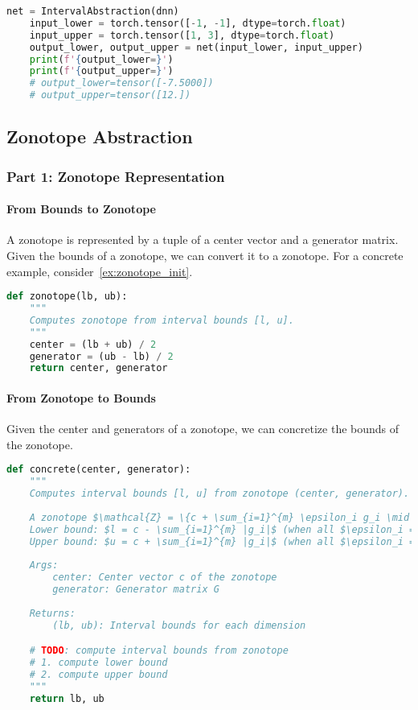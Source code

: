 \begin{lstlisting}[language=Python]
    net = IntervalAbstraction(dnn)
    input_lower = torch.tensor([-1, -1], dtype=torch.float)
    input_upper = torch.tensor([1, 3], dtype=torch.float)
    output_lower, output_upper = net(input_lower, input_upper)
    print(f'{output_lower=}')
    print(f'{output_upper=}')
    # output_lower=tensor([-7.5000])
    # output_upper=tensor([12.])
\end{lstlisting}


\subsection{Zonotope Abstraction}

\subsubsection{Part 1: Zonotope Representation}

\paragraph{From Bounds to Zonotope}

A zonotope is represented by a tuple of a center vector and a generator matrix. 
Given the bounds of a zonotope, we can convert it to a zonotope.
For a concrete example, consider~\autoref{ex:zonotope_init}.
\begin{lstlisting}[language=Python]
def zonotope(lb, ub):
    """
    Computes zonotope from interval bounds [l, u].
    """
    center = (lb + ub) / 2
    generator = (ub - lb) / 2
    return center, generator
\end{lstlisting}

\paragraph{From Zonotope to Bounds}

Given the center and generators of a zonotope, we can concretize the bounds of the zonotope.
\begin{lstlisting}[language=Python]
def concrete(center, generator):
    """
    Computes interval bounds [l, u] from zonotope (center, generator).
    
    A zonotope $\mathcal{Z} = \{c + \sum_{i=1}^{m} \epsilon_i g_i \mid \epsilon_i \in [-1,1]\}$ can be converted to interval bounds:
    Lower bound: $l = c - \sum_{i=1}^{m} |g_i|$ (when all $\epsilon_i = -\text{sign}(g_i)$)
    Upper bound: $u = c + \sum_{i=1}^{m} |g_i|$ (when all $\epsilon_i = +\text{sign}(g_i)$)
    
    Args:
        center: Center vector c of the zonotope
        generator: Generator matrix G 
        
    Returns:
        (lb, ub): Interval bounds for each dimension

    # TODO: compute interval bounds from zonotope
    # 1. compute lower bound
    # 2. compute upper bound
    """
    return lb, ub
    
\end{lstlisting}

